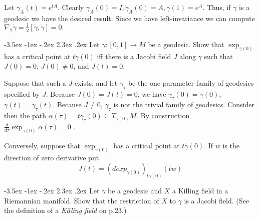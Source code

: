 \documentclass[10pt]{article}
\makeatletter
\renewcommand\section{\@startsection{section}{1}{\z@}%
                                  {-3.5ex \@plus -1ex \@minus -.2ex}%
                                  {2.3ex \@plus.2ex}%
                                  {\normalfont\large\bfseries}}
\DeclareMathOperator{\2}{II}
\makeatother
\begin{document}
Let $\gamma_A(t) = e^{tA}$. Clearly $\gamma_A(0) = I, \dot{\gamma}_A(0) = A, \gamma(1) = e^A$. Thus, if $\gamma$ is a geodesic we have the desired result. Since we have left-invariance we can compute $\nabla_{\dot{\gamma}}  \dot{\gamma} = \frac{1}{2}[\dot{\gamma}, \dot{\gamma}] =0.$


\section{Let $\gamma :[0,1] \to M$ be a geodesic. Show that $\exp_{\gamma(0)}$ has a critical point at $t \dot{\gamma}(0)$ iff there is a Jacobi field $J$ along $\gamma$ such that $J(0) = 0$, $\dot{J}(0) \neq 0$, and $J(t) =0$.}

Suppose that such a $J$ exists, and let $\gamma_\tau$ be the one parameter family of geodesics specified by $J$. Because $J(0)= J(t) = 0$, we have $\gamma_\tau (0) = \gamma(0)$, $\gamma(t) = \gamma_\tau(t)$. Because $\dot{J} \neq 0$, $\gamma_\tau$ is not the trivial family of geodesics. Consider then  the path $\alpha(\tau)  = t \dot{\gamma_\tau}(0) \subseteq T_{\gamma(0)}M$. By construction $ \frac{d}{d \tau} \exp_{\gamma(0)} \alpha(\tau) =0$ .

Conversely, suppose that $\exp_{\gamma(0)}$ has a critical point at $t \dot{\gamma}(0)$. If $w$ is the direction of zero derivative put
\[J(t) = ( d exp_{\gamma(0)})_{t \dot{\gamma}(0)}(tw)\]

\section{Let $\gamma$ be a geodesic and $X$ a Killing field in a Riemannian manifold. Show that the restriction of $X$ to $\gamma$ is a Jacobi field. (See the definition of a \emph{Killing field} on p.23.)}
\end{document}
